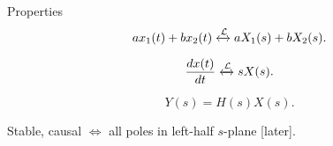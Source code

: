 \begin{frame}{Properties}
    \begin{equation*}
        ax_1(t) + bx_2(t) \xleftrightarrow{\mathcal{L}} aX_1(s) + bX_2(s).
    \end{equation*}

    \begin{equation*}
        \frac{dx(t)}{dt} \xleftrightarrow{\mathcal{L}} sX(s).
    \end{equation*}
    \begin{center}
        
    \end{center}


    \begin{equation*}
        Y(s) = H(s)X(s).
    \end{equation*}

    Stable, causal $\Leftrightarrow$ all poles in left-half $s$-plane [later].
\end{frame}



